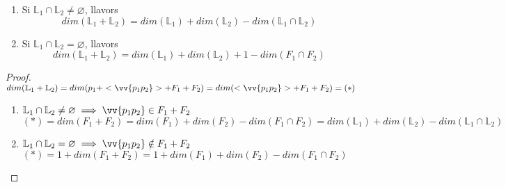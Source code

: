 \begin{thm}\begin{enumerate}[label=\emph{\alph*})]
	\item Si $\mathbb{L}_1\cap\mathbb{L}_2\neq\varnothing$, llavors 
	\[dim(\mathbb{L}_1+\mathbb{L}_2)=dim(\mathbb{L}_1)+dim(\mathbb{L}_2)-dim(\mathbb{L}_1\cap\mathbb{L}_2)\]
	\item Si $\mathbb{L}_1\cap\mathbb{L}_2=\varnothing$, llavors
	\[dim(\mathbb{L}_1+\mathbb{L}_2)=dim(\mathbb{L}_1)+dim(\mathbb{L}_2)+1-dim(F_1\cap F_2)\]
\end{enumerate}\end{thm}
\begin{proof}
	$dim(\mathbb{L}_1+\mathbb{L}_2)=dim(p_1+<\vv{p_1p_2}>+F_1+F_2)=dim(<\vv{p_1p_2}>+F_1+F_2)=(\ast )$ \\
	\begin{enumerate}[label=\emph{\alph*})]
	\item $\mathbb{L}_1\cap\mathbb{L}_2\neq\varnothing\implies\vv{p_1p_2}\in F_1+F_2$ \\
	$(\ast )=dim(F_1+F_2)=dim(F_1)+dim(F_2)-dim(F_1\cap F_2)=dim(\mathbb{L}_1)+dim(\mathbb{L}_2)-dim(\mathbb{L}_1\cap\mathbb{L}_2)$
	\item $\mathbb{L}_1\cap\mathbb{L}_2=\varnothing\implies\vv{p_1p_2}\notin F_1+F_2$ \\
	$(\ast )=1+dim(F_1+F_2)=1+dim(F_1)+dim(F_2)-dim(F_1\cap F_2)$
\end{enumerate}\end{proof}

